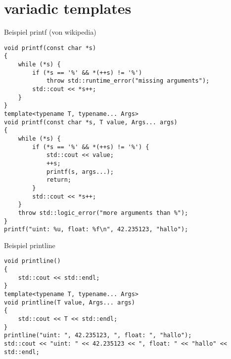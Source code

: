 \section{variadic templates}

\begin{frame}[fragile]{Beispiel printf (von wikipedia)}
	\begin{lstlisting}[basicstyle=\tiny]
void printf(const char *s)
{
    while (*s) {
        if (*s == '%' && *(++s) != '%')
            throw std::runtime_error("missing arguments");
        std::cout << *s++;
    }
}
template<typename T, typename... Args>
void printf(const char *s, T value, Args... args)
{
    while (*s) {
        if (*s == '%' && *(++s) != '%') {
            std::cout << value;
            ++s;
            printf(s, args...);
            return;
        }
        std::cout << *s++;
    }
    throw std::logic_error("more arguments than %");
}
printf("uint: %u, float: %f\n", 42.235123, "hallo");
\end{lstlisting}
\end{frame}

\begin{frame}[fragile]{Beispiel printline}
	\begin{lstlisting}[basicstyle=\tiny]
void printline()
{
    std::cout << std::endl;
}
template<typename T, typename... Args>
void printline(T value, Args... args)
{
    std::cout << T << std::endl;
}
printline("uint: ", 42.235123, ", float: ", "hallo");
std::cout << "uint: " << 42.235123 << ", float: " << "hallo" << std::endl;
\end{lstlisting}
\end{frame}
